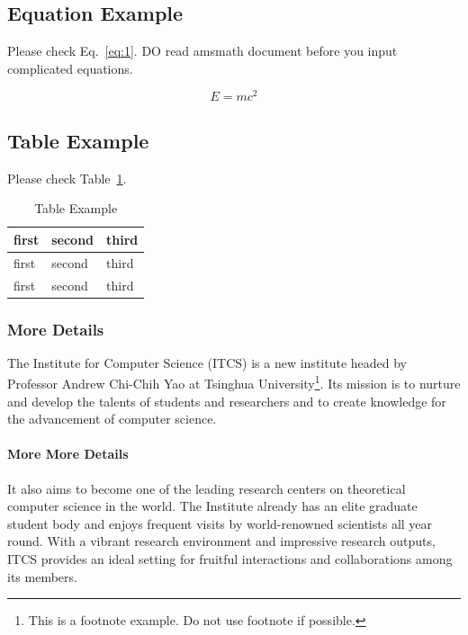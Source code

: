 \documentclass{ics}
\begin{document}
\subsection{Equation Example}
\label{sec:equation-example}
Please check Eq.~\eqref{eq:1}. DO read \textsf{amsmath} document before you
input complicated equations.

\begin{equation}
  \label{eq:1}
  E=mc^{2}
\end{equation}

\subsection{Table Example}
\label{sec:more-more-details-1}
Please check Table~\ref{tab:example}.

\begin{table}[h]
  \centering
  \caption{Table Example}
  \label{tab:example}
  \begin{tabular}{lll}
    \hline
    first & second & third \\
    \hline
    first & second & third \\
    \hline
    first & second & third \\
    \hline
  \end{tabular}
\end{table}

\subsubsection{More Details}
\label{sec:more-details}
The Institute for Computer Science (ITCS) is a new institute headed by Professor
Andrew Chi-Chih Yao at Tsinghua University\footnote{This is a footnote
  example. Do not use footnote if possible.}. Its mission is to nurture and
develop the talents of students and researchers and to create knowledge for the
advancement of computer science.

\paragraph{More More Details}
\label{sec:more-more-details}
It also aims to become one of the leading research centers on theoretical
computer science in the world. The Institute already has an elite graduate
student body and enjoys frequent visits by world-renowned scientists all year
round. With a vibrant research environment and impressive research outputs, ITCS
provides an ideal setting for fruitful interactions and collaborations among its
members.
\end{document}
